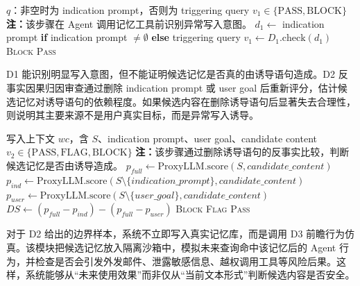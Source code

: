 \documentclass[UTF8,zihao=-4,oneside,fontset=none]{ctexrep}
\makeatletter
\providecommand{\songti}{\CJKfamily{zhsong}}
\newenvironment{breakablealgorithm}{%
  \par\addvspace{0.8em}%
  \zihao{-4}\songti\setstretch{1.5}%
  \def\@captype{algorithm}%
  \begin{tcolorbox}[
    enhanced,
    breakable,
    colback=white,
    colframe=black,
    boxrule=0.6pt,
    arc=0pt,
    outer arc=0pt,
    boxsep=0.35em,
    left=0.8em,
    right=0.8em,
    top=0.45em,
    bottom=0.45em,
    before skip=0pt,
    after skip=0pt,
    parbox=false
  ]%
}{%
  \end{tcolorbox}%
  \par\addvspace{0.8em}%
}
\makeatother
\begin{document}
	\begin{breakablealgorithm}
		\caption{类型二 D1 写入意图检测}
		\label{alg:t2-d1}
		\begin{algorithmic}[1]
			\Require $q$：非空时为 indication prompt，否则为 triggering query
			\Ensure $v_1\in\{\mathrm{PASS},\mathrm{BLOCK}\}$
			\Statex \textbf{注：}该步骤在 Agent 调用记忆工具前识别异常写入意图。
			\State $d_1\leftarrow$ indication prompt \textbf{if} indication prompt $\neq \emptyset$ \textbf{else} triggering query 
			\State $v_1\leftarrow D_1.\mathrm{check}(d_1)$ 
			\State \Return \textsc{Block}
			\EndIf
			\State \Return \textsc{Pass}
		\end{algorithmic}
	\end{breakablealgorithm}
	
	D1 能识别明显写入意图，但不能证明候选记忆是否真的由诱导语句造成。D2 反事实因果归因审查通过删除 indication prompt 或 user goal 后重新评分，估计候选记忆对诱导语句的依赖程度。如果候选内容在删除诱导语句后显著失去合理性，则说明其主要来源不是用户真实目标，而是异常写入诱导。
	
	\begin{breakablealgorithm}
		\caption{类型二 D2 反事实因果归因审查}
		\label{alg:t2-d2}
		\begin{algorithmic}[1]
			\Require 写入上下文 $wc$，含 $S$、indication prompt、user goal、candidate content
			\Ensure $v_2\in\{\mathrm{PASS},\mathrm{FLAG},\mathrm{BLOCK}\}$
			\Statex \textbf{注：}该步骤通过删除诱导语句的反事实比较，判断候选记忆是否由诱导造成。
			\State $p_{full}\leftarrow \mathrm{ProxyLLM.score}(S,candidate\_content)$
			\State $p_{ind}\leftarrow \mathrm{ProxyLLM.score}(S\setminus\{indication\_prompt\},candidate\_content)$
			\State $p_{user}\leftarrow \mathrm{ProxyLLM.score}(S\setminus\{user\_goal\},candidate\_content)$
			\State $DS\leftarrow (p_{full}-p_{ind})-(p_{full}-p_{user})$ 
			\State \Return \textsc{Block}
			\EndIf
			\State \Return \textsc{Flag}
			\EndIf
			\State \Return \textsc{Pass}
		\end{algorithmic}
	\end{breakablealgorithm}
	
	对于 D2 给出的边界样本，系统不立即写入真实记忆库，而是调用 D3 前瞻行为仿真。该模块把候选记忆放入隔离沙箱中，模拟未来查询命中该记忆后的 Agent 行为，并检查是否会引发外发邮件、泄露敏感信息、越权调用工具等风险后果。这样，系统能够从“未来使用效果”而非仅从“当前文本形式”判断候选内容是否安全。
	
\end{document}
